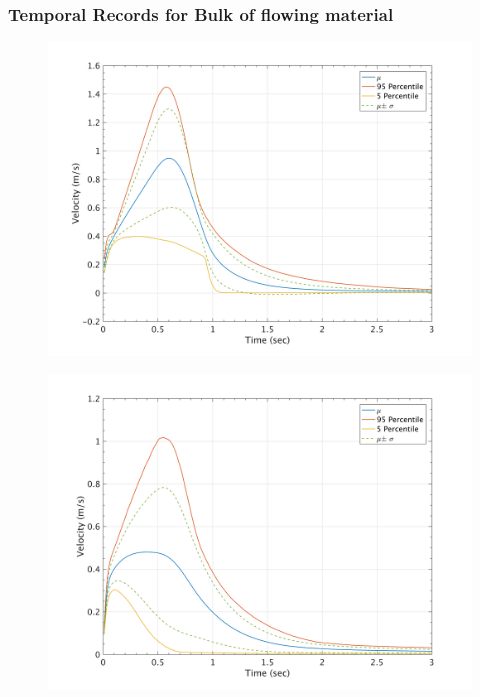 \documentclass{article}
\begin{document}
\subsubsection{Temporal Records for Bulk of flowing material}

\begin{figure}[H]
        \begin{minipage}[b]{0.5\linewidth}
                \centering
                \includegraphics[width=1\textwidth]{InclinedPlane/GlobalRecords/C_Global_Vel.png}
                \label{fig:Ramp-SP-Vel-C}
        \end{minipage}
        \begin{minipage}[b]{0.5\linewidth}
                \centering
                \includegraphics[width=1\textwidth]{InclinedPlane/GlobalRecords/P_Global_Vel.png}
                \label{fig:Ramp-SP-Vel-P}
        \end{minipage}


\end{figure}
\end{document}
